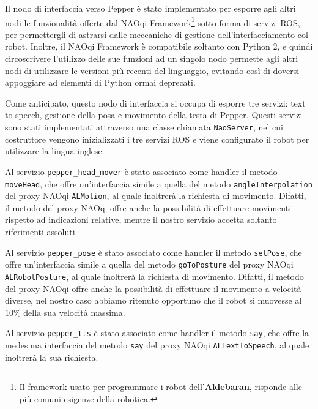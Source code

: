 Il nodo di interfaccia verso Pepper è stato implementato per esporre agli altri nodi le funzionalità offerte dal NAOqi Framework\footnote{Il framework usato per programmare i robot dell'\textbf{Aldebaran}, risponde alle più comuni esigenze della robotica.} sotto forma di servizi ROS, per permettergli di astrarsi dalle meccaniche di gestione dell'interfacciamento col robot. Inoltre, il NAOqi Framework è compatibile soltanto con Python 2, e quindi circoscrivere l'utilizzo delle sue funzioni ad un singolo nodo permette agli altri nodi di utilizzare le versioni più recenti del linguaggio, evitando così di doversi appoggiare ad elementi di Python ormai deprecati.


Come anticipato, questo nodo di interfaccia si occupa di esporre tre servizi: text to speech, gestione della posa e movimento della testa di Pepper. 
Questi servizi sono stati implementati attraverso una classe chiamata \verb|NaoServer|, nel cui costruttore vengono inizializzati i tre servizi ROS e viene configurato il robot per utilizzare la lingua inglese.

Al servizio \verb|pepper_head_mover| è stato associato come handler il metodo \verb|moveHead|, che offre un'interfaccia simile a quella del metodo \verb|angleInterpolation| del proxy NAOqi \verb|ALMotion|, al quale inoltrerà la richiesta di movimento. Difatti, il metodo del proxy NAOqi offre anche la possibilità di effettuare movimenti rispetto ad indicazioni relative, mentre il nostro servizio accetta soltanto riferimenti assoluti.

Al servizio \verb|pepper_pose| è stato associato come handler il metodo \verb|setPose|, che offre un'interfaccia simile a quella del metodo \verb|goToPosture| del proxy NAOqi \verb|ALRobotPosture|, al quale inoltrerà la richiesta di movimento. Difatti, il metodo del proxy NAOqi offre anche la possibilità di effettuare il movimento a velocità diverse, nel nostro caso abbiamo ritenuto opportuno che il robot si muovesse al $10\%$ della sua velocità massima.

Al servizio \verb|pepper_tts| è stato associato come handler il metodo \verb|say|, che offre la medesima interfaccia del metodo \verb|say| del proxy NAOqi \verb|ALTextToSpeech|, al quale inoltrerà la sua richiesta.

